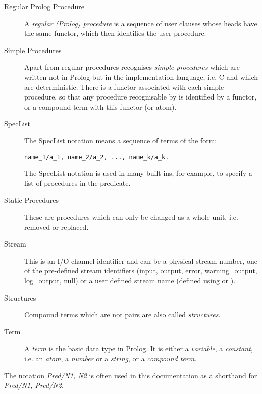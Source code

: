 \begin{description}
\item[Regular Prolog Procedure]
A {\it regular (Prolog) procedure} is a sequence of user clauses whose heads
have the same functor, which then identifies the user procedure.


\item[Simple Procedures]
Apart from regular procedures {\eclipse} recognises {\it simple procedures}
which are written not in Prolog but in the implementation language, i.e. C
and which are deterministic.
There is a functor associated with each
simple procedure, so that
any procedure recognisable by {\eclipse} is identified by a functor,
or a compound term with this functor (or atom).

\item[SpecList]
The SpecList notation means a sequence of terms of the form:
\begin{verbatim}
name_1/a_1, name_2/a_2, ..., name_k/a_k.
\end{verbatim}
The SpecList notation is used in many built-ins, for example, 
to specify a list of procedures in the
 predicate.

\item[Static Procedures]
These are procedures which can only be changed as a whole unit, i.e. removed or 
replaced.

\item[Stream]
This is an I/O channel identifier and can be a physical stream number, one of 
the pre-defined stream identifiers (input, output, error, warning_output, log_output, null)
or a user defined stream name (defined using
 or ). 

\item[Structures]
Compound terms which are not pairs are also called {\it structures}.

\item[Term]
A {\it term} is the basic data type in Prolog.
It is either a {\it variable}, a {\it constant},
i.e. an {\it atom}, a {\it number} or a {\it string},
or a {\it compound term}.

\end{description}

The notation {\it Pred/N1, N2} is often used in this documentation
as a shorthand for {\it Pred/N1, Pred/N2}.

